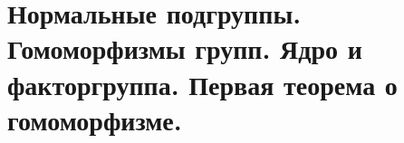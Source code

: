 \section{
    Нормальные подгруппы. Гомоморфизмы групп. Ядро и факторгруппа. Первая теорема о гомоморфизме. 
}





